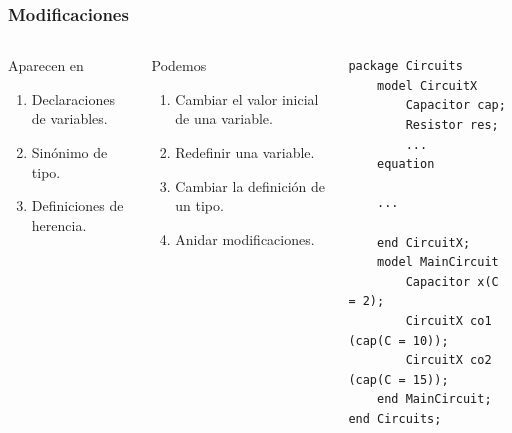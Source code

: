 \begin{frame}[fragile]
\frametitle{Modificaciones} 
\begin{columns}  
\column[T]{7cm}
\begin{block}{Aparecen en}
\begin{enumerate}
    \item Declaraciones de variables.
    \item Sinónimo de tipo.
    \item Definiciones de herencia.
\end{enumerate} 
\end{block}

\begin{block}{Podemos}
\begin{enumerate}
    \item Cambiar el valor inicial de una variable.    
    \item Redefinir una variable.
    \item Cambiar la definición de un tipo.
    \item Anidar modificaciones.
\end{enumerate}
\end{block}
\column[T]{7cm}
\begin{lstlisting}[style=base]
package Circuits
    model CircuitX
        Capacitor cap;
        Resistor res;
        ...
    equation 
    
    ...
        
    end CircuitX;
    model MainCircuit
        Capacitor x(C = 2);
        CircuitX co1 (cap(C = 10));
        CircuitX co2 (cap(C = 15));
    end MainCircuit;
end Circuits;
\end{lstlisting}

 
\end{columns}
\end{frame}

